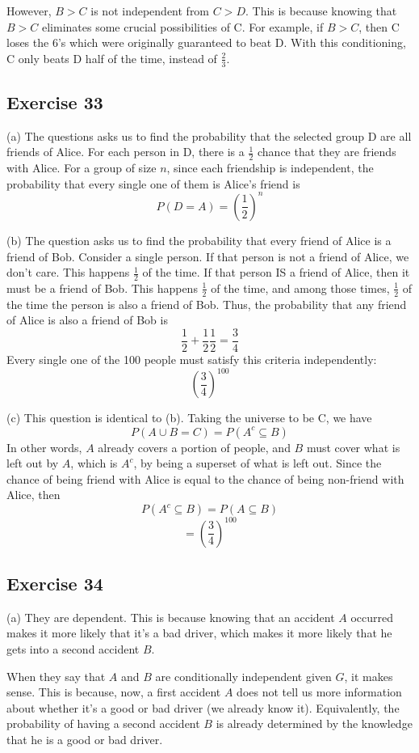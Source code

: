\documentclass{book}
\begin{document}
However, $B > C$ is not independent from $C > D$. This is because knowing that $B > C$ eliminates some crucial possibilities of C. For example, if $B > C$, then C loses the 6's which were originally guaranteed to beat D. With this conditioning, C only beats D half of the time, instead of $\frac{2}{3}$.

\subsection*{Exercise 33}
(a) The questions asks us to find the probability that the selected group D are all friends of Alice. For each person in D, there is a $\frac{1}{2}$ chance that they are friends with Alice. For a group of size $n$, since each friendship is independent, the probability that every single one of them is Alice's friend is
$$P(D = A) = \left(\frac{1}{2}\right)^n$$

\noindent
(b) The question asks us to find the probability that every friend of Alice is a friend of Bob. Consider a single person. If that person is not a friend of Alice, we don't care. This happens $\frac{1}{2}$ of the time. If that person IS a friend of Alice, then it must be a friend of Bob. This happens $\frac{1}{2}$ of the time, and among those times, $\frac{1}{2}$ of the time the person is also a friend of Bob. Thus, the probability that any friend of Alice is also a friend of Bob is
$$\frac{1}{2} + \frac{1}{2}\frac{1}{2} = \frac{3}{4}$$
Every single one of the 100 people must satisfy this criteria independently:
$$\left(\frac{3}{4}\right)^{100}$$

\noindent
(c) This question is identical to (b). Taking the universe to be C, we have
$$P(A \cup B = C) = P(A^c \subseteq B)$$
In other words, $A$ already covers a portion of people, and $B$ must cover what is left out by $A$, which is $A^c$, by being a superset of what is left out. Since the chance of being friend with Alice is equal to the chance of being non-friend with Alice, then
$$P(A^c \subseteq B) = P(A \subseteq B)$$
$$= \left(\frac{3}{4}\right)^{100}$$

\subsection*{Exercise 34}
(a) They are dependent. This is because knowing that an accident $A$ occurred makes it more likely that it's a bad driver, which makes it more likely that he gets into a second accident $B$.

When they say that $A$ and $B$ are conditionally independent given $G$, it makes sense. This is because, now, a first accident $A$ does not tell us more information about whether it's a good or bad driver (we already know it). Equivalently, the probability of having a second accident $B$ is already determined by the knowledge that he is a good or bad driver.
\end{document}
